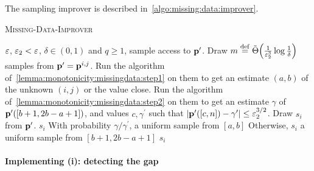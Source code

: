\noindent The sampling improver is described in~\cref{algo:missing:data:improver}.
\begin{algorithm}\caption{\textsc{Missing-Data-Improver}}\label{algo:missing:data:improver}
\begin{algorithmic}[1]
  \Require $\varepsilon$, $\varepsilon_2 < \varepsilon$, $\delta \in (0,1)$ and $q\geq 1$, sample access to $\mathbf{p}^\prime$.
  \Start{}
    \State Draw $m\eqdef\tildeTheta{\frac{1}{\eps_2^3}\log\frac{1}{\delta}}$ samples from $\mathbf{p}^\prime=\mathbf{p}^{i,j}$.
    \State Run the algorithm of~\cref{lemma:monotonicity:missingdata:step1} on them to get an estimate $(a,b)$ of the unknown $(i,j)$ or the value \textsf{close}.
    \State Run the algorithm of~\cref{lemma:monotonicity:missingdata:step2} on them to get an estimate $\gamma$ of $\mathbf{p}^\prime([b+1,2b-a+1])$, and     values $c,\gamma^\prime$ such that $\left\lvert \mathbf{p}^\prime([c,n])-\gamma^\prime \right\rvert\leq\varepsilon_2^{3/2}$.
  \End
  \Start{}
      \State Draw $s_i$ from $\mathbf{p}^\prime$.
      \label{algo:step:already:close}
        \State \Return $s_i$ 
      \EndIf
        \State With probability $\gamma/\gamma^\prime$, \Return a uniform sample from $[a,b]$
        \State Otherwise, \Return $s_i$
        \State \Return a uniform sample from $[b+1,2b-a+1]$ 
      \Else
        \State \Return $s_i$ 
      \EndIf
    \EndFor
  \End
\end{algorithmic}
\end{algorithm}

\paragraph{Implementing \textsf{(i)}: detecting the gap}

